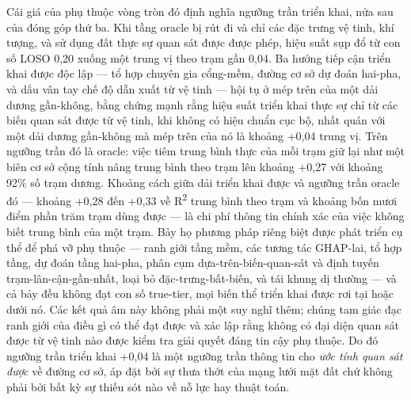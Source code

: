 Cái giá của phụ thuộc vòng tròn đó định nghĩa ngưỡng trần triển khai, nửa sau của đóng góp thứ ba. Khi tầng oracle bị rút đi và chỉ các đặc trưng vệ tinh, khí tượng, và sử dụng đất thực sự quan sát được được phép, hiệu suất sụp đổ từ con số LOSO 0,20 xuống một trung vị theo trạm gần 0,04. Ba hướng tiếp cận triển khai được độc lập --- tổ hợp chuyên gia cổng-mềm, đường cơ sở dự đoán hai-pha, và dấu vân tay chế độ dẫn xuất từ vệ tinh --- hội tụ ở mép trên của một dải dương gần-không, bằng chứng mạnh rằng hiệu suất triển khai thực sự chỉ từ các biến quan sát được từ vệ tinh, khi không có hiệu chuẩn cục bộ, nhất quán với một dải dương gần-không mà mép trên của nó là khoảng +0,04 trung vị. Trên ngưỡng trần đó là oracle: việc tiêm trung bình thực của mỗi trạm giữ lại như một biên cơ sở cộng tính nâng trung bình theo trạm lên khoảng +0,27 với khoảng 92\% số trạm dương. Khoảng cách giữa dải triển khai được và ngưỡng trần oracle đó --- khoảng +0,28 đến +0,33 về R\textsuperscript{2} trung bình theo trạm và khoảng bốn mươi điểm phần trăm trạm dùng được --- là chi phí thông tin chính xác của việc không biết trung bình của một trạm. Bảy họ phương pháp riêng biệt được phát triển cụ thể để phá vỡ phụ thuộc --- ranh giới tầng mềm, các tương tác GHAP-lai, tổ hợp tầng, dự đoán tầng hai-pha, phân cụm dựa-trên-biến-quan-sát và định tuyến trạm-lân-cận-gần-nhất, loại bỏ đặc-trưng-bất-biến, và tái khung dị thường --- và cả bảy đều không đạt con số true-tier, mọi biến thể triển khai được rơi tại hoặc dưới nó. Các kết quả âm này không phải một suy nghĩ thêm; chúng tam giác đạc ranh giới của điều gì có thể đạt được và xác lập rằng không có đại diện quan sát được từ vệ tinh nào được kiểm tra giải quyết đáng tin cậy phụ thuộc. Do đó ngưỡng trần triển khai +0,04 là một ngưỡng trần thông tin cho \emph{ước tính quan sát được} về đường cơ sở, áp đặt bởi sự thưa thớt của mạng lưới mặt đất chứ không phải bởi bất kỳ sự thiếu sót nào về nỗ lực hay thuật toán.

